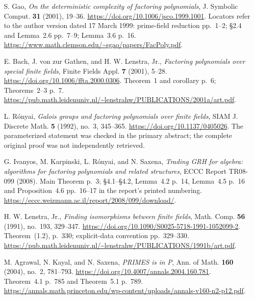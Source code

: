 S. Gao, \emph{On the deterministic complexity of factoring polynomials},
J. Symbolic Comput. \textbf{31} (2001), 19--36.
\url{https://doi.org/10.1006/jsco.1999.1001}.
Locators refer to the author version dated 17 March 1999:
prime-field reduction pp.~1--2; \S2.4 and Lemma~2.6 pp.~7--9;
Lemma~3.6 p.~16.
\url{https://www.math.clemson.edu/~sgao/papers/FacPoly.pdf}.

E. Bach, J. von zur Gathen, and H. W. Lenstra, Jr.,
\emph{Factoring polynomials over special finite fields},
Finite Fields Appl. \textbf{7} (2001), 5--28.
\url{https://doi.org/10.1006/ffta.2000.0306}.
Theorem~1 and corollary p.~6; Theorems~2--3 p.~7.
\url{https://pub.math.leidenuniv.nl/~lenstrahw/PUBLICATIONS/2001a/art.pdf}.

L. R\'onyai, \emph{Galois groups and factoring polynomials over finite fields},
SIAM J. Discrete Math. \textbf{5} (1992), no.~3, 345--365.
\url{https://doi.org/10.1137/0405026}.
The parameterized statement was checked in the primary abstract;
the complete original proof was not independently retrieved.

G. Ivanyos, M. Karpinski, L. R\'onyai, and N. Saxena,
\emph{Trading GRH for algebra: algorithms for factoring polynomials and related structures},
ECCC Report TR08-099 (2008).
Main Theorem p.~3; \S4.1--\S4.2, Lemma~4.2 p.~14,
Lemma~4.5 p.~16 and Proposition~4.6 pp.~16--17
in the report's printed numbering.
\url{https://eccc.weizmann.ac.il/report/2008/099/download/}.

H. W. Lenstra, Jr., \emph{Finding isomorphisms between finite fields},
Math. Comp. \textbf{56} (1991), no.~193, 329--347.
\url{https://doi.org/10.1090/S0025-5718-1991-1052099-2}.
Theorem~(1.2), p.~330; explicit-data convention pp.~329--330.
\url{https://pub.math.leidenuniv.nl/~lenstrahw/PUBLICATIONS/1991b/art.pdf}.

M. Agrawal, N. Kayal, and N. Saxena, \emph{PRIMES is in P},
Ann. of Math. \textbf{160} (2004), no.~2, 781--793.
\url{https://doi.org/10.4007/annals.2004.160.781}.
Theorem~4.1 p.~785 and Theorem~5.1 p.~789.
\url{https://annals.math.princeton.edu/wp-content/uploads/annals-v160-n2-p12.pdf}.
